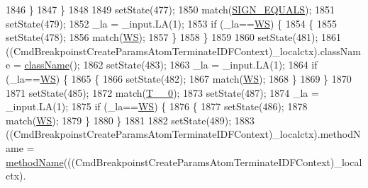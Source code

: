 \begin{DoxyCode}
1846           \}
1847         \}
1848 
1849         setState(477);
1850         match(\hyperlink{classgov_1_1nasa_1_1jpf_1_1inspector_1_1server_1_1expression_1_1parser_1_1_expression_grammar_parser_a4dc93cc6563a32e75e7006cb71acb7b7}{SIGN\_EQUALS});
1851         setState(479);
1852         \_la = \_input.LA(1);
1853         \textcolor{keywordflow}{if} (\_la==\hyperlink{classgov_1_1nasa_1_1jpf_1_1inspector_1_1server_1_1expression_1_1parser_1_1_expression_grammar_parser_ace44714ae633c7b14794cc5a24d9ebf3}{WS}) \{
1854           \{
1855           setState(478);
1856           match(\hyperlink{classgov_1_1nasa_1_1jpf_1_1inspector_1_1server_1_1expression_1_1parser_1_1_expression_grammar_parser_ace44714ae633c7b14794cc5a24d9ebf3}{WS});
1857           \}
1858         \}
1859 
1860         setState(481);
1861         ((CmdBreakpoinstCreateParamsAtomTerminateIDFContext)\_localctx).className = 
      \hyperlink{classgov_1_1nasa_1_1jpf_1_1inspector_1_1server_1_1expression_1_1parser_1_1_expression_grammar_parser_aafe03b251eef204ae911768faa5fd862}{className}();
1862         setState(483);
1863         \_la = \_input.LA(1);
1864         \textcolor{keywordflow}{if} (\_la==\hyperlink{classgov_1_1nasa_1_1jpf_1_1inspector_1_1server_1_1expression_1_1parser_1_1_expression_grammar_parser_ace44714ae633c7b14794cc5a24d9ebf3}{WS}) \{
1865           \{
1866           setState(482);
1867           match(\hyperlink{classgov_1_1nasa_1_1jpf_1_1inspector_1_1server_1_1expression_1_1parser_1_1_expression_grammar_parser_ace44714ae633c7b14794cc5a24d9ebf3}{WS});
1868           \}
1869         \}
1870 
1871         setState(485);
1872         match(\hyperlink{classgov_1_1nasa_1_1jpf_1_1inspector_1_1server_1_1expression_1_1parser_1_1_expression_grammar_parser_ab0a310bb11915e0b57fa255ecfd30de9}{T\_\_0});
1873         setState(487);
1874         \_la = \_input.LA(1);
1875         \textcolor{keywordflow}{if} (\_la==\hyperlink{classgov_1_1nasa_1_1jpf_1_1inspector_1_1server_1_1expression_1_1parser_1_1_expression_grammar_parser_ace44714ae633c7b14794cc5a24d9ebf3}{WS}) \{
1876           \{
1877           setState(486);
1878           match(\hyperlink{classgov_1_1nasa_1_1jpf_1_1inspector_1_1server_1_1expression_1_1parser_1_1_expression_grammar_parser_ace44714ae633c7b14794cc5a24d9ebf3}{WS});
1879           \}
1880         \}
1881 
1882         setState(489);
1883         ((CmdBreakpoinstCreateParamsAtomTerminateIDFContext)\_localctx).methodName = 
      \hyperlink{classgov_1_1nasa_1_1jpf_1_1inspector_1_1server_1_1expression_1_1parser_1_1_expression_grammar_parser_aac9184fdab918306e0886559ac17f396}{methodName}(((CmdBreakpoinstCreateParamsAtomTerminateIDFContext)\_localctx).

\end{DoxyCode}
